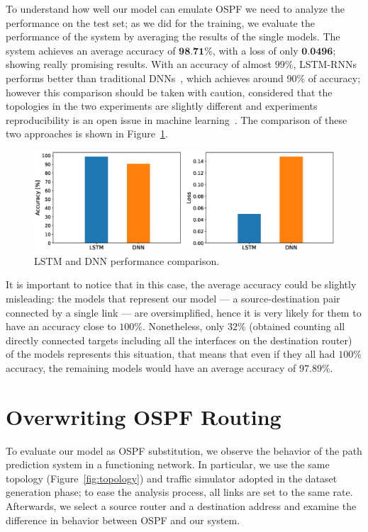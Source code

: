 To understand how well our model can emulate OSPF we need to analyze the performance on the test set; as we did for the training, we evaluate the performance of the system by averaging the results of the single models. The system achieves an average accuracy of $\textbf{98.71\%}$, with a loss of only $\textbf{0.0496}$; showing really promising results. 
%
With an accuracy of almost $99\%$, LSTM-RNNs performs better than traditional DNNs~\cite{Kato}, which achieves around 90\% of accuracy; however this comparison should be taken with caution, considered that the topologies in the two experiments are slightly different and experiments reproducibility is an open issue in machine learning~\cite{olorisade2017reproducibility}. The comparison of these two approaches is shown in Figure~\ref{fig:lstm_dnn}.

\begin{figure}[b]
\centering
\includegraphics[width=\textwidth]{img/lstm_dnn}
\caption{LSTM and DNN performance comparison.}
\label{fig:lstm_dnn}
\end{figure}

It is important to notice that in this case, the average accuracy could be slightly misleading: the models that represent our model --- a source-destination pair connected by a single link --- are oversimplified, hence it is very likely for them to have an accuracy close to $100\%$. Nonetheless, only $32\%$ (obtained counting all directly connected targets including all the interfaces on the destination router) of the models represents this situation, that means that even if they all had $100\%$ accuracy, the remaining models would have an average accuracy of $97.89\%$.

\section{Overwriting OSPF Routing}
To evaluate our model as OSPF substitution, we observe the behavior of the path prediction system in a functioning network. 
In particular, we  use the same topology (Figure~\ref{fig:topology}) and traffic simulator adopted in the dataset generation phase; to ease the analysis process, all links are set to the same rate. Afterwards, we select a source router and a destination address and examine the difference in behavior between OSPF and our system.

